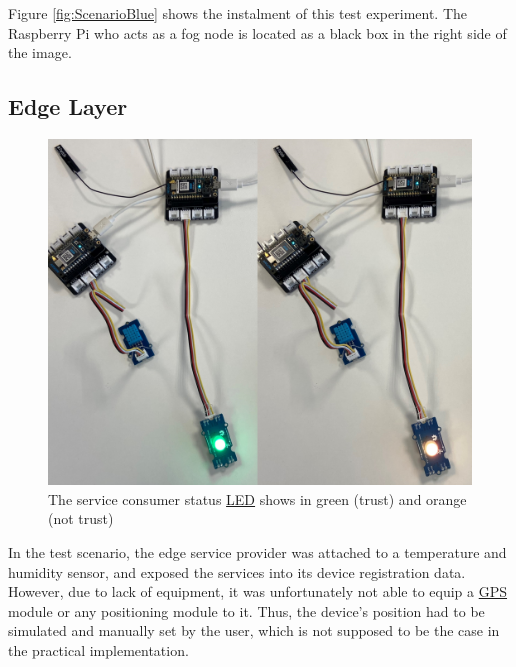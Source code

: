 \npara Figure \ref{fig:ScenarioBlue} shows the instalment of this test experiment.
The Raspberry Pi who acts as a fog node is located as a black box in the right side of the image.

\subsection*{Edge Layer}

\begin{figure}[hbt!]
  \centering
  \includegraphics[width=\textwidth]{images/ScenarioGreenOrange.png}
  \caption{The service consumer status \hyperref[Acronym-LED]{LED} shows in green (trust) and orange (not trust)}
  \label{fig:ScenarioGreenOrange}
\end{figure}

\npara In the test scenario, the edge service provider was attached to a temperature and humidity sensor, and exposed the services into its device registration data.
However, due to lack of equipment, it was unfortunately not able to equip a \hyperref[Acronym-GPS]{GPS} module or any positioning module to it.
Thus, the device's position had to be simulated and manually set by the user, which is not supposed to be the case in the practical implementation.

